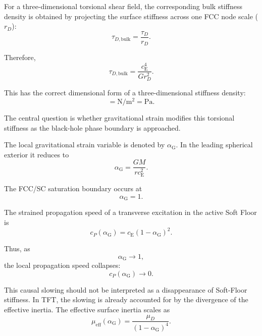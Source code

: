 For a three-dimensional torsional shear field, the corresponding bulk stiffness density is obtained by projecting the surface stiffness across one FCC node scale ($r_D$):
\begin{equation}
    \tau_{D,\mathrm{bulk}} = \frac{\tau_D}{r_D}.
\end{equation}

Therefore,
\begin{equation}
    \tau_{D,\mathrm{bulk}} = \frac{c_{\mathrm{E}}^4}{G r_D^2}.
\end{equation}

This has the correct dimensional form of a three-dimensional stiffness density:
\begin{equation}
    [\tau_{D,\mathrm{bulk}}] = \mathrm{N/m^2} = \mathrm{Pa}.
\end{equation}

The central question is whether gravitational strain modifies this torsional stiffness as the black-hole phase boundary is approached.

The local gravitational strain variable is denoted by $\alpha_{\mathrm{G}}$. In the leading spherical exterior it reduces to
\begin{equation}
    \alpha_{\mathrm{G}} = \frac{GM}{r c_{\mathrm{E}}^2}.
\end{equation}

The FCC/SC saturation boundary occurs at
\begin{equation}
    \alpha_{\mathrm{G}} = 1.
\end{equation}

The strained propagation speed of a transverse excitation in the active Soft Floor is
\begin{equation}
    c_P(\alpha_{\mathrm{G}}) = c_{\mathrm{E}}(1-\alpha_{\mathrm{G}})^2.
\end{equation}

Thus, as
\begin{equation}
    \alpha_{\mathrm{G}} \rightarrow 1,
\end{equation}
the local propagation speed collapses:
\begin{equation}
    c_P(\alpha_{\mathrm{G}}) \rightarrow 0.
\end{equation}

This causal slowing should not be interpreted as a disappearance of Soft-Floor stiffness. In TFT, the slowing is already accounted for by the divergence of the effective inertia. The effective surface inertia scales as
\begin{equation}
    \mu_{\mathrm{eff}}(\alpha_{\mathrm{G}}) = \frac{\mu_D}{(1-\alpha_{\mathrm{G}})^4}.
\end{equation}

